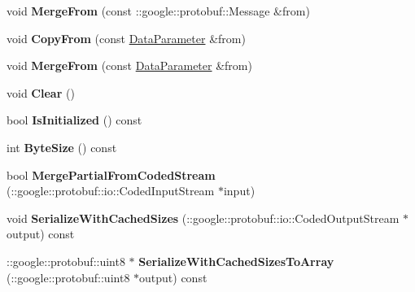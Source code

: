\begin{DoxyCompactItemize}
void {\bfseries Merge\+From} (const \+::google\+::protobuf\+::\+Message \&from)
\item 
\mbox{\label{classcaffe_1_1_data_parameter_a97c3a872a5a5a1f8ae4b964be294d06d}} 
void {\bfseries Copy\+From} (const \mbox{\hyperlink{classcaffe_1_1_data_parameter}{Data\+Parameter}} \&from)
\item 
\mbox{\label{classcaffe_1_1_data_parameter_ac40c46f8b306e225d9abc44f246db1b4}} 
void {\bfseries Merge\+From} (const \mbox{\hyperlink{classcaffe_1_1_data_parameter}{Data\+Parameter}} \&from)
\item 
\mbox{\label{classcaffe_1_1_data_parameter_aef48755220b98346aa3423f69d4e6a7d}} 
void {\bfseries Clear} ()
\item 
\mbox{\label{classcaffe_1_1_data_parameter_a4b91ccbaba3254a3743a5a16a9f2d4cf}} 
bool {\bfseries Is\+Initialized} () const
\item 
\mbox{\label{classcaffe_1_1_data_parameter_ad51659abd1c05108daf83f540df92db8}} 
int {\bfseries Byte\+Size} () const
\item 
\mbox{\label{classcaffe_1_1_data_parameter_af43db8960acb563548c21ba46b997005}} 
bool {\bfseries Merge\+Partial\+From\+Coded\+Stream} (\+::google\+::protobuf\+::io\+::\+Coded\+Input\+Stream $\ast$input)
\item 
\mbox{\label{classcaffe_1_1_data_parameter_abfa1376cc86f85c8e18b12be85c2a80f}} 
void {\bfseries Serialize\+With\+Cached\+Sizes} (\+::google\+::protobuf\+::io\+::\+Coded\+Output\+Stream $\ast$output) const
\item 
\mbox{\label{classcaffe_1_1_data_parameter_a10f1b279d7845708abcc3982dc6fa3ad}} 
\+::google\+::protobuf\+::uint8 $\ast$ {\bfseries Serialize\+With\+Cached\+Sizes\+To\+Array} (\+::google\+::protobuf\+::uint8 $\ast$output) const
\item 
\mbox{\label{classcaffe_1_1_data_parameter_a2c64ee99f4adbb2e48ed52868b94014b}} 

\end{DoxyCompactItemize}
